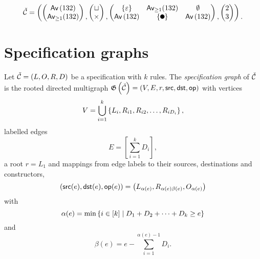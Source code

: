 \[
    \spec{C} = \left(
    \begin{pmatrix}\Av{132}\\\textsf{Av}_{\geq1}(132)\end{pmatrix}
    \begin{matrix}\\,\end{matrix}
    \begin{pmatrix}\sqcup\\ \times\end{pmatrix}
    \begin{matrix}\\,\end{matrix}
    \begin{pmatrix}
    \set{\varepsilon} & \textsf{Av}_{\geq1}(132) & \emptyset \\
    \Av{132} & \set{\point{0.1}} & \Av{132}
    \end{pmatrix}
    \begin{matrix}\\,\end{matrix}
    \begin{pmatrix}2\\3\end{pmatrix}
    \right)\begin{matrix}\\.\end{matrix}
\]

\section{Specification graphs}
\begin{definition}
Let $\check{\mathcal{C}} = \left(L, O, R, D\right)$ be a specification with $k$ rules. The \emph{specification graph} of $\check{\mathcal{C}}$ is the rooted directed multigraph $\mathfrak{G}\left(\check{\mathcal{C}}\right) = (V,E,r,\textsf{src},\textsf{dst},\textsf{op})$ with vertices 
\[
    V = \bigcup_{i=1}^k\left\{L_i,R_{i1},R_{i2},\dotsc,R_{iD_i}\right\},
\]
labelled edges
\[
    E = \left[\sum_{i=1}^kD_i\right],
\]
a root $r = L_1$ and mappings from edge labels to their sources, destinations and constructors, 
\[
    (\textsf{src}(e), \textsf{dst}(e), \textsf{op}(e)) = \left(L_{\alpha(e)},R_{\alpha(e)\beta(e)},O_{\alpha(e)}\right)
\]
with
\[
    \alpha(e) = \min\left\{i \in [k] \mid D_1 + D_2 + \dotsm + D_k \geq e\right\}
\]
and
\[
    \beta(e) = e-\sum_{i=1}^{\alpha(e) - 1}D_i.
\]
\end{definition}


